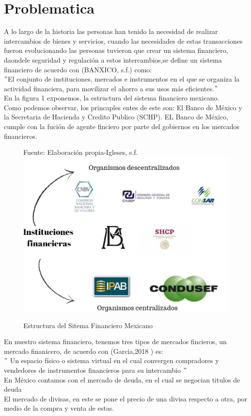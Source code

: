 \documentclass[12pt,a4paper]{article}
\begin{document}
	\section{Problematica}
	\hfill\break
	A lo largo de la historia las personas han tenido la necesidad de realizar intercambios de bienes y servicios, cuando
	las necesidades de estas transacciones fueron evolucionando  las personas tuvieron que crear  un sistema financiero, daondele seguridad  y regulación a estos intercambios,se define un sistema financiero de acuerdo con  (BANXICO, s.f.) como:\\
	\hfill\break
	$"$El conjunto de instituciones, mercados e instrumentos en el que se organiza la actividad financiera, para movilizar el ahorro a sus usos más eficientes.$"$\\
	\break
	En la figura 1 exponemos, la estructura del sistema financiero mexicano.\\
	Como podemos observar, los princaples entes de este son: El Banco de México y la Secretaria de Hacienda y Credito Publico (SCHP). EL Banco de México, cumple con la fución de agente finciero por parte del gobiernos en los mercados financieros.\\
	\begin{figure}
		\centering
		\caption{Estructura del Sitema Financiero Mexicano}{{\footnotesize Fuente: Elaboración propia-Igleses, s.f.}}
		\includegraphics[scale=0.4]{estructurasfm.jpg}
	\end{figure}
	\newpage
	\hfill\break
	En  nuestro sistema financiero, tenemos tres  tipos de mercados fincieros, un mercado finanicero, de acuerdo con (Garcia,2018 ) es:\\
    \hfill\break
	$"$ Un espacio físico o sistema virtual en el cual convergen compradores y vendedores de instrumentos financieros para su intercambio $"$\\
	\hfill\break
    En México contamos con el mercado de deuda, en el cual se negocian titulos de deuda \\
    El mercado de divisas, en este se pone el precio de una divisa respecto a otra,  por medio de  la compra y venta de estas.\\
    
\end{document}
